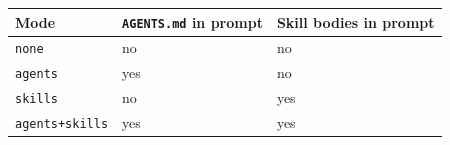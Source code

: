 \begingroup\small\renewcommand{\arraystretch}{1.12}
\begin{tabular}{@{}lll@{}}
\toprule
Mode & \texttt{AGENTS.md} in prompt & Skill bodies in prompt \\
\midrule
\texttt{none} & no & no \\
\texttt{agents} & yes & no \\
\texttt{skills} & no & yes \\
\texttt{agents+skills} & yes & yes \\
\bottomrule
\end{tabular}\endgroup
